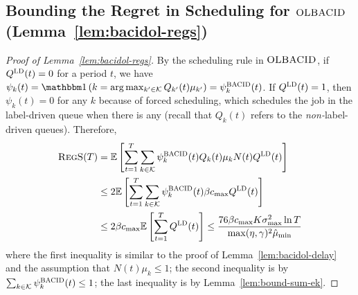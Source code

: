 \subsection{Bounding the Regret in Scheduling for $\textsc{OLBACID}$ (Lemma~\ref{lem:bacidol-regs})}\label{app:lem-bacidol-regs}
\begin{proof}[Proof of Lemma~\ref{lem:bacidol-regs}]
By the scheduling rule in $\textsc{OLBACID}$, if $Q^{\mathcal{\textsc{LD}}}(t) = 0$ for a period $t$, we have $\psi_k(t) = \indic{k = \arg\max_{k' \in \set{K}} Q_{k'}(t)\mu_{k'}} = \psi_k^{\bacid}(t)$. If $Q^{\mathcal{\textsc{LD}}}(t) = 1$, then $\psi_k(t) = 0$ for any $k$ because of forced scheduling, which schedules the job in the label-driven queue when there is any (recall that $Q_k(t)$ refers to the \emph{non-}label-driven queues). Therefore, 
\begin{align*}
\textsc{RegS}(T) &= \mathbb E\left[\sum_{t=1}^T \sum_{k \in \mathcal{K}} \psi_k^{\textsc{BACID}}(t)Q_k(t)\mu_kN(t)Q^{\mathcal{\textsc{LD}}}(t)\right] \\
&\leq 2\mathbb E\left[\sum_{t=1}^T \sum_{k \in \mathcal{K}} \psi_k^{\textsc{BACID}}(t)\beta c_{\max}Q^{\mathcal{\textsc{LD}}}(t)\right] \\
&\leq 2\beta c_{\max}\mathbb E\left[\sum_{t=1}^T Q^{\mathcal{\textsc{LD}}}(t)\right] \leq \frac{76\beta c_{\max}K\sigma^2_{\max}\ln T}{\max(\eta,\gamma)^2\hat{\mu}_{\min}}
\end{align*}
where the first inequality is similar to the proof of Lemma~\ref{lem:bacidol-delay} and the assumption that $N(t)\mu_k \leq 1$; the second inequality is by $\sum_{k\in \mathcal{K}} \psi_k^{\textsc{BACID}}(t) \leq 1$; the last inequality is by Lemma~\ref{lem:bound-sum-ek}.
\end{proof}